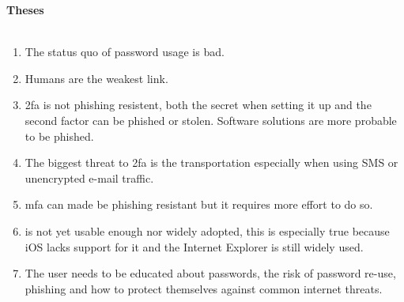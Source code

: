 \thispagestyle{noheader}

\begin{large}
	\textbf{Theses} \\ \\
\end{large}


\begin{enumerate}
	\setlength{\itemsep}{1cm}
	\item The status quo of password usage is bad.
	\item Humans are the weakest link.
	\item \gls{2fa} is not phishing resistent, both the secret when setting it up and the second factor can be phished or stolen. Software solutions are more probable to be phished.
	\item The biggest threat to \gls{2fa} is the transportation especially when using SMS or unencrypted e-mail traffic.
	\item \gls{mfa} can made be phishing resistant but it requires more effort to do so.	
	\item \wa{} is not yet usable enough nor widely adopted, this is especially true because iOS lacks support for it and the Internet Explorer is still widely used.
	\item The user needs to be educated about passwords, the risk of password re-use, phishing and how to protect themselves against common internet threats.
\end{enumerate}
